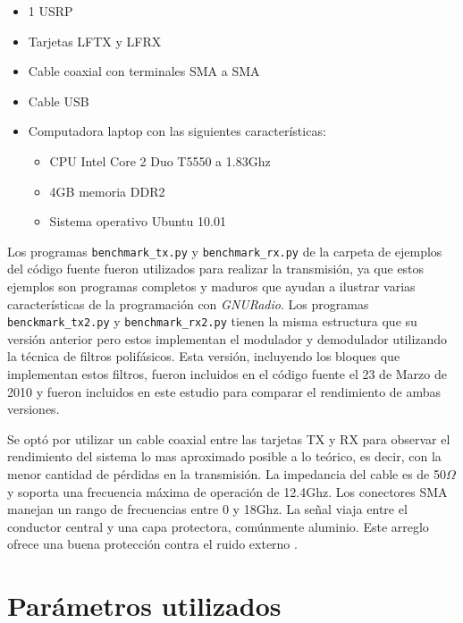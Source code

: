 \begin{itemize}
  \item 1 USRP
  \item Tarjetas LFTX y LFRX
  \item Cable coaxial con terminales SMA a SMA
  \item Cable USB
  \item Computadora laptop con las siguientes caracter\'isticas:
  \begin {itemize}
    \item CPU Intel Core 2 Duo T5550 a 1.83Ghz
    \item 4GB memoria DDR2
    \item Sistema operativo Ubuntu 10.01
  \end{itemize}
\end{itemize}

Los programas \verb|benchmark_tx.py| y \verb|benchmark_rx.py| de la carpeta de ejemplos del c\'odigo
fuente fueron utilizados para realizar la transmisi\'on, ya que estos ejemplos son programas
completos y maduros que ayudan a ilustrar varias caracter\'isticas de la programaci\'on con
\emph{GNURadio}. Los programas \verb|benckmark_tx2.py| y \verb|benchmark_rx2.py| tienen la misma
estructura que su versi\'on anterior pero estos implementan el modulador y demodulador utilizando la
t\'ecnica de filtros polif\'asicos. Esta versi\'on, incluyendo los bloques que implementan estos
filtros, fueron incluidos en el c\'odigo fuente el 23 de Marzo de 2010 y fueron incluidos en este
estudio para comparar el rendimiento de ambas versiones.

Se opt\'o por utilizar un cable coaxial entre las tarjetas TX y RX para observar el rendimiento del sistema lo mas aproximado
posible a lo te\'orico, es decir, con la menor cantidad de p\'erdidas en la transmisi\'on. La impedancia del cable es de
50$\Omega$ y soporta una frecuencia m\'axima de operaci\'on de 12.4Ghz. Los conectores SMA manejan un rango de frecuencias entre
0 y 18Ghz. La se\~nal viaja entre el conductor central y una capa protectora, com\'unmente aluminio. Este arreglo ofrece una
buena protecci\'on contra el ruido externo \cite{coax}.


\section{Par\'ametros utilizados}
\label{sec:params}

